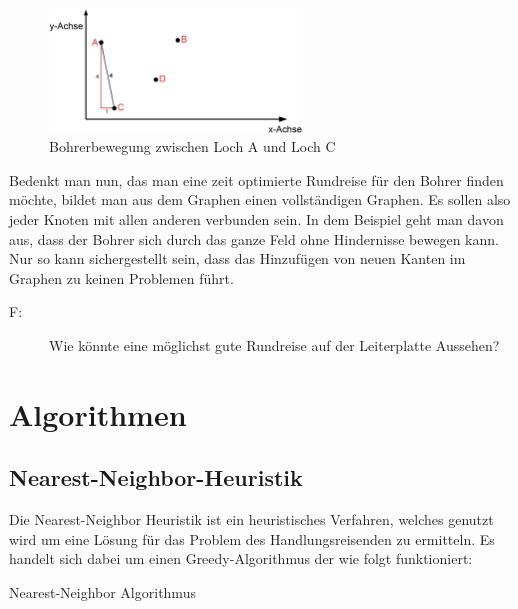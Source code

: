 \documentclass{article}
\begin{document}
\begin{figure}[H]
	\centering
	\includegraphics[width=0.6\textwidth]{leiterplatine2.jpg}
	\caption{Bohrerbewegung zwischen Loch A und Loch C}
	\label{abb_leiterplatine2}
\end{figure}

Bedenkt man nun, das man eine zeit optimierte Rundreise für den Bohrer finden möchte, bildet man aus dem Graphen einen vollständigen Graphen. Es sollen also jeder Knoten mit allen anderen verbunden sein. In dem Beispiel geht man davon aus, dass der Bohrer sich durch das ganze Feld ohne Hindernisse bewegen kann. Nur so kann sichergestellt sein, dass das Hinzufügen von neuen Kanten im Graphen zu keinen Problemen führt.
\\
\begin{description}
	\item[F:] Wie könnte eine möglichst gute Rundreise auf der Leiterplatte Aussehen?
\end{description}




%
%
%
\section{Algorithmen}

\subsection{Nearest-Neighbor-Heuristik}

Die Nearest-Neighbor Heuristik ist ein heuristisches Verfahren, welches genutzt wird um eine Lösung für das Problem des Handlungsreisenden zu ermitteln. Es handelt sich dabei um einen Greedy-Algorithmus der wie folgt funktioniert:

\begin{algorithm}
\caption{Nearest-Neighbor Algorithmus}
\end{algorithm}
\end{document}
